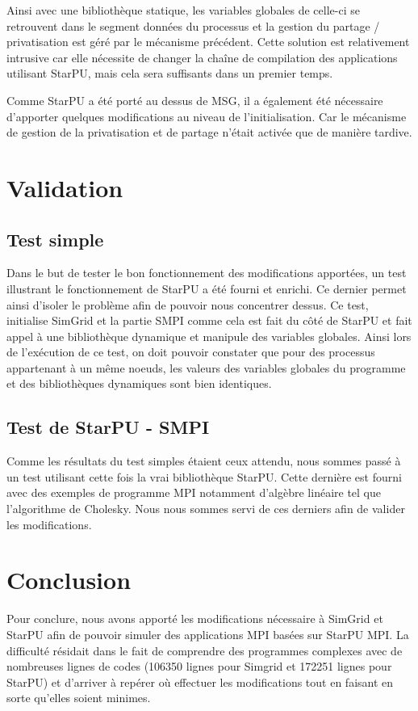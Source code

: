 \documentclass[smallextended]{svjour3}
\begin{document}
Ainsi avec une bibliothèque statique, les variables globales de
celle-ci se retrouvent dans le segment données du processus et la
gestion du partage / privatisation est géré par le mécanisme
précédent. Cette solution est relativement intrusive car
elle nécessite de changer la chaîne de compilation des applications
utilisant StarPU, mais cela sera suffisants dans un premier temps. 

Comme StarPU a été porté au dessus de MSG, il a également été
nécessaire d'apporter quelques modifications au niveau de
l'initialisation. Car le mécanisme de gestion de la privatisation et
de partage n'était activée que de manière tardive. 

\section{Validation}
\label{sec-6}
\subsection{Test simple}
\label{sec-6-1}
Dans le but de tester le bon fonctionnement des modifications
apportées, un test illustrant le fonctionnement de StarPU a été
fourni et enrichi. Ce dernier permet ainsi d'isoler le problème
afin de pouvoir nous concentrer dessus. Ce test, initialise SimGrid
et la partie SMPI comme cela est fait du côté de StarPU et fait
appel à une bibliothèque dynamique et manipule des variables
globales. Ainsi lors de l'exécution de ce test, on doit pouvoir
constater que pour des processus appartenant à un même noeuds, les
valeurs des variables globales du programme et des bibliothèques
dynamiques sont bien identiques.  
\subsection{Test de StarPU - SMPI}
\label{sec-6-2}
Comme les résultats du test simples étaient ceux attendu, nous
sommes passé à un test utilisant cette fois la vrai bibliothèque
StarPU. Cette dernière est fourni avec des exemples de programme MPI
notamment d'algèbre linéaire tel que l'algorithme de Cholesky. Nous
nous sommes servi de ces derniers afin de valider les
modifications. 
\section{Conclusion}
\label{sec-7}
Pour conclure, nous avons apporté les modifications nécessaire à 
SimGrid et StarPU afin de pouvoir simuler des applications MPI basées 
sur StarPU MPI. La difficulté résidait dans le fait de comprendre des 
programmes complexes avec de nombreuses lignes de codes (106350 lignes 
pour Simgrid et 172251 lignes pour StarPU) et d'arriver à repérer où 
effectuer les modifications tout en faisant en sorte qu'elles soient 
minimes.
\end{document}
